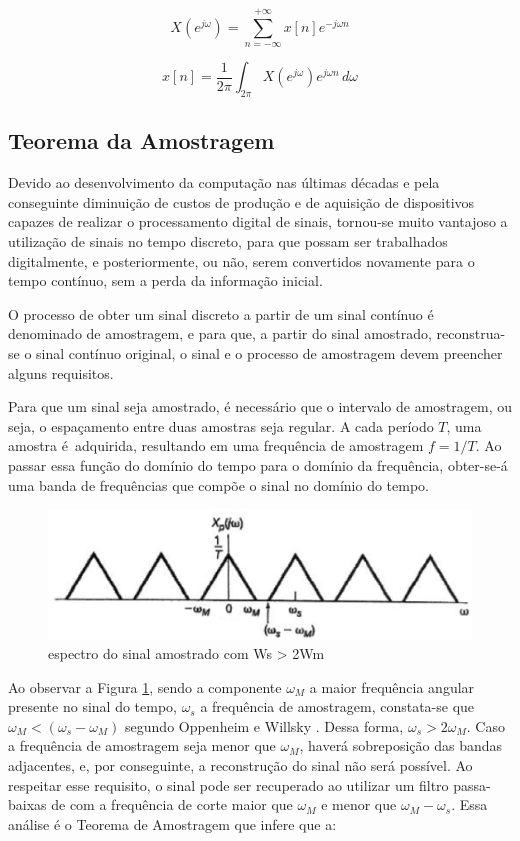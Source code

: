 \begin{equation}  \label{eq:03}
X(e^{j\omega})= \sum_{n=-\infty}^{+\infty} x[n]e^{-j\omega n}
\end{equation}

\begin{equation}  \label{eq:04}
x[n]=\frac{1}{2\pi} \int_{2\pi}^{} X(e^{j\omega})e^{j\omega n} \,d\omega
\end{equation}

\subsection{Teorema da Amostragem}
Devido ao desenvolvimento da computação nas últimas décadas e pela conseguinte diminuição de custos de produção e de aquisição de dispositivos capazes de realizar o processamento digital de sinais, tornou-se muito vantajoso a utilização de sinais no tempo discreto, para que possam ser trabalhados digitalmente, e posteriormente, ou não, serem convertidos novamente para o tempo contínuo, sem a perda da informação inicial. 

O processo de obter um sinal discreto a partir de um sinal contínuo é denominado de amostragem, e para que, a partir do sinal amostrado, reconstrua-se o sinal contínuo original, o sinal e o processo de amostragem devem preencher alguns requisitos.

Para que um sinal seja amostrado, é necessário que o intervalo de amostragem, ou seja, o espaçamento entre duas amostras seja regular. A cada período $T$, uma amostra é adquirida, resultando em uma frequência de amostragem $f = 1/T$.
Ao passar essa função do domínio do tempo para o domínio da frequência, obter-se-á uma banda de frequências que compõe o sinal no domínio do tempo.

\begin{figure}[h]
	\centering
    \includegraphics[scale=0.5]{figuras/fig03.eps}
	\caption{espectro do sinal amostrado com Ws > 2Wm}
	\label{fig03}
\end{figure}

Ao observar a Figura \ref{fig03}, sendo a componente $\omega_M$ a maior frequência angular presente no sinal do tempo, $\omega_s$ a frequência de amostragem, constata-se que $\omega_M<(\omega_s-\omega_M)$ segundo Oppenheim e Willsky \cite{oppenheim2010sinais}. Dessa forma, $\omega_s>2\omega_M$. Caso a frequência de amostragem seja menor que $\omega_M$, haverá sobreposição das bandas adjacentes, e, por conseguinte, a reconstrução do sinal não será possível. Ao respeitar esse requisito, o sinal pode ser recuperado ao utilizar um filtro passa-baixas de com a frequência de corte maior que $\omega_M$ e menor que $\omega_M-\omega_s$.
Essa análise é o Teorema de Amostragem que infere que a:

